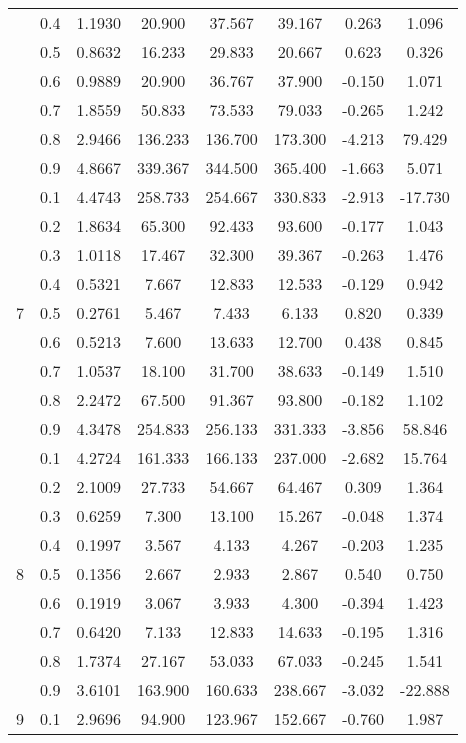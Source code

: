 \documentclass[11pt,a4paper]{report}
\begin{document}
\begin{longtable}{ | c | c || c | c | c | c | c | c | }
 & 0.4 & 1.1930 & 20.900 & 37.567 & 39.167 & 0.263 & 1.096 \\
 & 0.5 & 0.8632 & 16.233 & 29.833 & 20.667 & 0.623 & 0.326 \\
 & 0.6 & 0.9889 & 20.900 & 36.767 & 37.900 & -0.150 & 1.071 \\
 & 0.7 & 1.8559 & 50.833 & 73.533 & 79.033 & -0.265 & 1.242 \\
 & 0.8 & 2.9466 & 136.233 & 136.700 & 173.300 & -4.213 & 79.429 \\
 & 0.9 & 4.8667 & 339.367 & 344.500 & 365.400 & -1.663 & 5.071 \\
 \hline
\multirow{9}{*}{7} & 0.1 & 4.4743 & 258.733 & 254.667 & 330.833 & -2.913 & -17.730 \\
 & 0.2 & 1.8634 & 65.300 & 92.433 & 93.600 & -0.177 & 1.043 \\
 & 0.3 & 1.0118 & 17.467 & 32.300 & 39.367 & -0.263 & 1.476 \\
 & 0.4 & 0.5321 & 7.667 & 12.833 & 12.533 & -0.129 & 0.942 \\
 & 0.5 & 0.2761 & 5.467 & 7.433 & 6.133 & 0.820 & 0.339 \\
 & 0.6 & 0.5213 & 7.600 & 13.633 & 12.700 & 0.438 & 0.845 \\
 & 0.7 & 1.0537 & 18.100 & 31.700 & 38.633 & -0.149 & 1.510 \\
 & 0.8 & 2.2472 & 67.500 & 91.367 & 93.800 & -0.182 & 1.102 \\
 & 0.9 & 4.3478 & 254.833 & 256.133 & 331.333 & -3.856 & 58.846 \\
 \hline
\multirow{9}{*}{8} & 0.1 & 4.2724 & 161.333 & 166.133 & 237.000 & -2.682 & 15.764 \\
 & 0.2 & 2.1009 & 27.733 & 54.667 & 64.467 & 0.309 & 1.364 \\
 & 0.3 & 0.6259 & 7.300 & 13.100 & 15.267 & -0.048 & 1.374 \\
 & 0.4 & 0.1997 & 3.567 & 4.133 & 4.267 & -0.203 & 1.235 \\
 & 0.5 & 0.1356 & 2.667 & 2.933 & 2.867 & 0.540 & 0.750 \\
 & 0.6 & 0.1919 & 3.067 & 3.933 & 4.300 & -0.394 & 1.423 \\
 & 0.7 & 0.6420 & 7.133 & 12.833 & 14.633 & -0.195 & 1.316 \\
 & 0.8 & 1.7374 & 27.167 & 53.033 & 67.033 & -0.245 & 1.541 \\
 & 0.9 & 3.6101 & 163.900 & 160.633 & 238.667 & -3.032 & -22.888 \\
 \hline
\multirow{9}{*}{9} & 0.1 & 2.9696 & 94.900 & 123.967 & 152.667 & -0.760 & 1.987 \\

\end{longtable}
\end{document}
